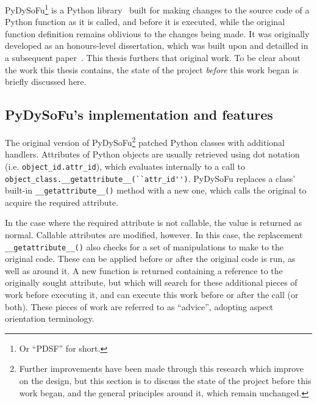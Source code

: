 
PyDySoFu\footnote{Or ``PDSF'' for short.} is a Python library~\cite{pdsf_repo}
built for making changes to the source code of a Python function as it is
called, and before it is executed, while the original function definition
remains oblivious to the changes being made. It was originally developed as an
honours-level dissertation, which was built upon and detailled in a subsequent
paper~\cite{wallis2018caise}. This thesis furthers that original work. To be
clear about the work this thesis contains, the state of the project
\emph{before} this work began is briefly discussed here.

\subsection{PyDySoFu's implementation and features}

The original version of PyDySoFu\footnote{Further improvements have been made
through this research which improve on the design, but this section is to
discuss the state of the project before this work began, and the general
principles around it, which remain unchanged.} patched Python classes with
additional handlers. Attributes of Python objects are usually retrieved using
dot notation (i.e. \lstinline{object_id.attr_id}), which evaluates internally to
a call to \lstinline{object_class.__getattribute__(``attr_id'')}. PyDySoFu replaces a
class' built-in \lstinline{__getattribute__()} method with a new one, which
calls the original to acquire the required attribute. 

In the case where the required attribute is not callable, the value is returned
as normal. Callable attributes are modified, however. In this case, the
replacement \lstinline{__getattribute__()} also checks for a set of
manipulations to make to the original code. These can be applied before or after
the original code is run, as well as around it. A new function is returned
containing a reference to the originally sought attribute, but which will search
for these additional pieces of work before executing it, and can execute this
work before or after the call (or both). These pieces of work are referred to as
``advice'', adopting aspect orientation terminology.

